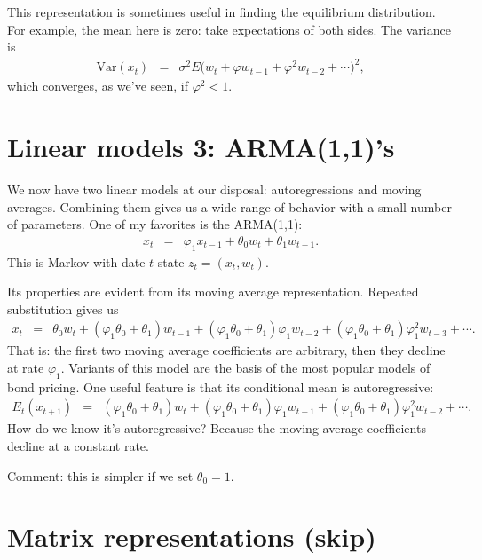 \documentclass[11pt]{article}
\begin{document}
This representation is sometimes useful in finding the equilibrium distribution.
For example, the mean here is zero:  take expectations of both sides.
The variance is
\begin{eqnarray*}
    \mbox{Var} (x_{t})
            &=& \sigma^2 E  \big( w_t + \varphi w_{t-1} + \varphi^2 w_{t-2}
                + \cdots \big)^2 , %
\end{eqnarray*}
which converges, as we've seen, if $\varphi^2 < 1$.


\section{Linear models 3:  ARMA(1,1)'s}


We now have two linear models at our disposal:  autoregressions and moving averages.
Combining them gives us a wide range of behavior with a small number
of parameters.
One of my favorites is the ARMA(1,1):
\begin{eqnarray*}
    x_t &=& \varphi_1 x_{t-1} + \theta_0 w_t + \theta_1 w_{t-1} .
\end{eqnarray*}
This is Markov with date $t$ state $z_{t} = (x_t,w_t)$.

Its properties are evident from its moving average representation.
Repeated substitution gives us
\begin{eqnarray*}
    x_t &=&  \theta_0 w_t + (\varphi_1\theta_0+ \theta_1) w_{t-1}
                + (\varphi_1\theta_0+ \theta_1)\varphi_1 w_{t-2}
                +  (\varphi_1\theta_0+ \theta_1)\varphi_1^2 w_{t-3} + \cdots .
\end{eqnarray*}
That is:  the first two moving average coefficients are arbitrary,
then they decline at rate $\varphi_1$.
Variants of this model are the basis of the most popular models of bond pricing.
One useful feature is that its conditional mean is autoregressive:
\begin{eqnarray*}
  E_t ( x_{t+1} ) &=&  (\varphi_1\theta_0+ \theta_1) w_{t}
                + (\varphi_1\theta_0+ \theta_1)\varphi_1 w_{t-1}
                +  (\varphi_1\theta_0+ \theta_1)\varphi_1^2 w_{t-2} + \cdots .
\end{eqnarray*}
How do we know it's autoregressive?
Because the moving average coefficients decline at a constant rate.

Comment:  this is simpler if we set $\theta_0 = 1$.

\section{Matrix representations (skip)}
\label{sec:matrix}
\end{document}
